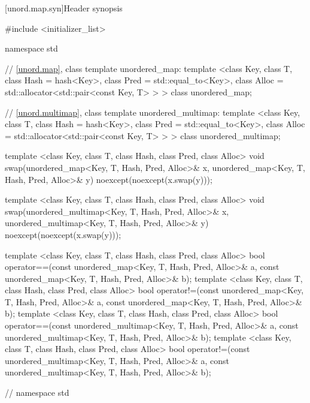 [unord.map.syn]{Header  synopsis}%
%
%
%
\begin{codeblock}
#include <initializer_list>

namespace std {
  // \ref{unord.map}, class template unordered_map:
  template <class Key,
            class T,
            class Hash = hash<Key>,
            class Pred = std::equal_to<Key>,
            class Alloc = std::allocator<std::pair<const Key, T> > >
    class unordered_map;

  // \ref{unord.multimap}, class template unordered_multimap:
  template <class Key,
            class T,
            class Hash = hash<Key>,
            class Pred = std::equal_to<Key>,
            class Alloc = std::allocator<std::pair<const Key, T> > >
    class unordered_multimap;

  template <class Key, class T, class Hash, class Pred, class Alloc>
    void swap(unordered_map<Key, T, Hash, Pred, Alloc>& x,
              unordered_map<Key, T, Hash, Pred, Alloc>& y)
      noexcept(noexcept(x.swap(y)));

  template <class Key, class T, class Hash, class Pred, class Alloc>
    void swap(unordered_multimap<Key, T, Hash, Pred, Alloc>& x,
              unordered_multimap<Key, T, Hash, Pred, Alloc>& y)
      noexcept(noexcept(x.swap(y)));

  template <class Key, class T, class Hash, class Pred, class Alloc>
    bool operator==(const unordered_map<Key, T, Hash, Pred, Alloc>& a,
                    const unordered_map<Key, T, Hash, Pred, Alloc>& b);
  template <class Key, class T, class Hash, class Pred, class Alloc>
    bool operator!=(const unordered_map<Key, T, Hash, Pred, Alloc>& a,
                    const unordered_map<Key, T, Hash, Pred, Alloc>& b);
  template <class Key, class T, class Hash, class Pred, class Alloc>
    bool operator==(const unordered_multimap<Key, T, Hash, Pred, Alloc>& a,
                    const unordered_multimap<Key, T, Hash, Pred, Alloc>& b);
  template <class Key, class T, class Hash, class Pred, class Alloc>
    bool operator!=(const unordered_multimap<Key, T, Hash, Pred, Alloc>& a,
                    const unordered_multimap<Key, T, Hash, Pred, Alloc>& b);
} // namespace std
\end{codeblock}

